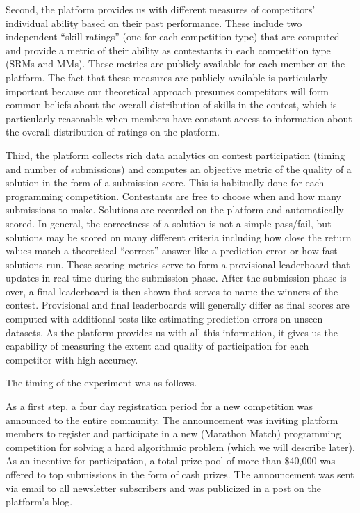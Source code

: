 \documentclass[10pt, titlepage]{article}
\begin{document}
Second, the platform provides us with different measures of competitors'
individual ability based on their past performance. These include two
independent ``skill ratings'' (one for each competition type) that are
computed and provide a metric of their ability as contestants in each
competition type (SRMs and MMs). These metrics are publicly available
for each member on the platform. The fact that these measures are
publicly available is particularly important because our theoretical
approach presumes competitors will form common beliefs about the overall
distribution of skills in the contest, which is particularly reasonable
when members have constant access to information about the overall
distribution of ratings on the platform.

Third, the platform collects rich data analytics on contest
participation (timing and number of submissions) and computes an
objective metric of the quality of a solution in the form of a
submission score. This is habitually done for each programming
competition. Contestants are free to choose when and how many
submissions to make. Solutions are recorded on the platform and
automatically scored. In general, the correctness of a solution is not a
simple pass/fail, but solutions may be scored on many different criteria
including how close the return values match a theoretical ``correct''
answer like a prediction error or how fast solutions run. These scoring
metrics serve to form a provisional leaderboard that updates in real
time during the submission phase. After the submission phase is over, a
final leaderboard is then shown that serves to name the winners of the
contest. Provisional and final leaderboards will generally differ as
final scores are computed with additional tests like estimating
prediction errors on unseen datasets. As the platform provides us with
all this information, it gives us the capability of measuring the extent
and quality of participation for each competitor with high accuracy.

The timing of the experiment was as follows.

As a first step, a four day registration period for a new competition
was announced to the entire community. The announcement was inviting
platform members to register and participate in a new (Marathon Match)
programming competition for solving a hard algorithmic problem (which we
will describe later). As an incentive for participation, a total prize
pool of more than \$40,000 was offered to top submissions in the form of
cash prizes. The announcement was sent via email to all newsletter
subscribers and was publicized in a post on the platform's blog.
\end{document}
